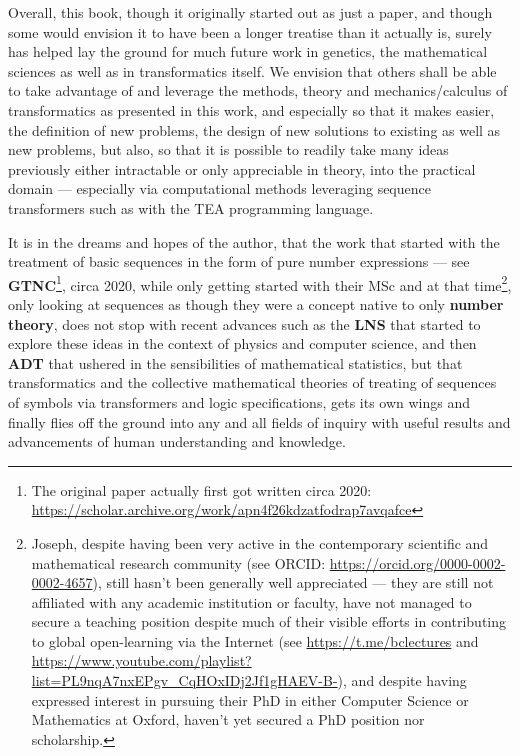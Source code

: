\documentclass[a4paper, 18pt]{book} %
\begin{document}
Overall, this book, though it originally started out as just a paper, and though some would envision it to have been a longer treatise than it actually is, surely has helped lay the ground for much future work in genetics, the mathematical sciences as well as in transformatics itself. We envision that others shall be able to take advantage of and leverage the methods, theory and mechanics/calculus of transformatics as presented in this work, and especially so that it makes easier, the definition of new problems, the design of new solutions to existing as well as new problems, but also, so that it is possible to readily take many ideas previously either intractable or only appreciable in theory, into the practical domain --- especially via computational methods leveraging sequence transformers such as with the TEA programming language.

It is in the dreams and hopes of the author, that the work that started with the treatment of basic sequences in the form of pure number expressions --- see \textbf{GTNC}\footnote{The original paper actually first got written circa 2020: \url{https://scholar.archive.org/work/apn4f26kdzatfodrap7avqafce}}\cite{Lutalo2024gtnc}, circa 2020, while only getting started with their MSc and at that time\footnote{Joseph, despite having been very active in the contemporary scientific and mathematical research community (see ORCID: \url{https://orcid.org/0000-0002-0002-4657}), still hasn't been generally well appreciated --- they are still not affiliated with any academic institution or faculty, have not managed to secure a teaching position despite much of their visible efforts in contributing to global open-learning via the Internet (see \url{https://t.me/bclectures} and \url{https://www.youtube.com/playlist?list=PL9nqA7nxEPgv_CqHOxIDj2Jf1gHAEV-B-}), and despite having expressed interest in pursuing their PhD in either Computer Science or Mathematics at Oxford\cite{lutalo_2025_sop}, haven't yet secured a PhD position nor scholarship.}, only looking at sequences as though they were a concept native to only \textbf{number theory}, does not stop with recent advances such as the \textbf{LNS}\cite{lnspaper} that started to explore these ideas in the context of physics and computer science, and then \textbf{ADT} that ushered in the sensibilities of mathematical statistics, but that transformatics and the collective mathematical theories of treating of sequences of symbols via transformers and logic specifications, gets its own wings and finally flies off the ground into any and all fields of inquiry with useful results and advancements of human understanding and knowledge. 
\end{document}
